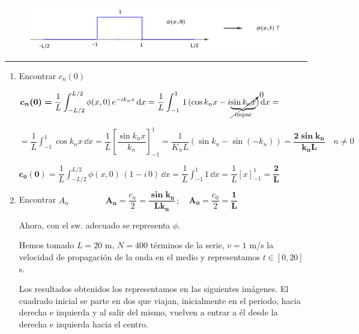\begin{example}
	
	\begin{figure}[H]
	\centering
	\includegraphics[width=.95\textwidth]{imagenes/apendices-DFT6.png}
\end{figure}
\rule{200pt}{0.1pt}
\begin{enumerate}
\item  Encontrar $c_n(0)$

$\boldsymbol{c_n(0)=}\displaystyle \dfrac 1 L \int_{-L/2}^{L/2} \phi(x,0)\, e^{-ik_n x}\, \dd x= \dfrac 1 L \int_{-1}^{1}\, 1\, (\cos k_n x -i \cancelto{0}{ \underbrace{\sin k_n x}_{\text{impar}} } ) \, \dd x    = $

$= \displaystyle \dfrac 1 L \int_{-1}^{1} \cos k_n x \, \dd x = \dfrac 1 L \left[ \dfrac{\sin k_n x}{k_n} \right]_{-1}^{1}=\dfrac 1{K_nL} (\sin k_n - \sin (-k_n))= \boldsymbol{ \dfrac{2\sin k_n}{k_n L} } \quad n\neq 0$

$\boldsymbol{ c_0(0) } =\displaystyle \dfrac 1 L \int_{-L/2}^{L/2} \phi(x,0)\, (1-i\, 0) \, \dd x=
\dfrac 1 L \int_{-1}^1 1\, \dd x = \dfrac 1 L [x]_{-1}^{1}= \boldsymbol{\dfrac 2 L}$

\item  Encontrar $A_n$ $\qquad \qquad \boldsymbol{ A_n=}\dfrac{c_n}2= \boldsymbol{\dfrac{\sin k_n}{Lk_n}}\, ; \quad  \boldsymbol{A_0=}\dfrac{c_0}2= \boldsymbol{\dfrac 1 L} $

Ahora, con el sw. adecuado se representa $\phi$. 

Hemos tomado $L=20$ m, $N=400$ términos de la serie, $v=1$ m/s la velocidad de propagación de la onda en el medio y representamos $t\in [0,20]$ s.

Los resultados obtenidos los representamos en las siguientes imágenes. El cuadrado inicial se parte en dos que viajan, inicialmente en el periodo, hacia derecha e izquierda y al salir del mismo, vuelven a entrar a él desde la derecha e izquierda hacia el centro.
\end{enumerate}


\end{example}
